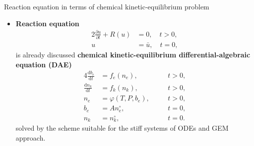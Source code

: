 \begin{frame}{Reaction equation in terms of chemical kinetic-equilibrium problem}
	\begin{itemize}
		\item{\bf Reaction equation} 
		\begin{alignat*}{2}
			\tfrac{\partial u}{\partial t}+R(u) & = 0, \quad  t > 0, \\[-5pt]
			u & = \bar{u}, \quad  t = 0,
		\end{alignat*}
		is already discussed \alert{\bf chemical kinetic-equilibrium differential-algebraic equation (DAE)} 
		\begin{alignat*}{4}
			\tfrac{\mathrm{d}b_{e}}{\mathrm{d}t} & = f_e(n_e), %
			& \quad  &  t > 0, \\
			\tfrac{\mathrm{d}n_{k}}{\mathrm{d}t} & = f_k(n_k),
			&  \quad & t>0, \\
			n_{e}  & = \varphi(T,P,b_{e}), & \quad  &  t > 0, \\
			b_{e}  & = An_{e}^{\circ},       & \quad  & t = 0, \\
			n_{k}  & = n_{k}^{\circ},         & \quad  & t=0.			
		\end{alignat*}
		solved by the scheme suitable for the stiff systems of ODEs and GEM approach.
	\end{itemize}
	
\end{frame}
%
%
